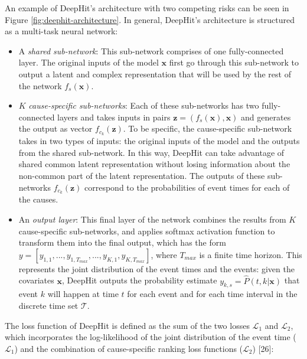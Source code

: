 \documentclass[
]{article}
\providecommand{\tightlist}{%
  \setlength{\itemsep}{0pt}\setlength{\parskip}{0pt}}
\begin{document}
An example of DeepHit's architecture with two competing risks can be seen in Figure \ref{fig:deephit-architecture}. In general, DeepHit's architecture is structured as a multi-task neural network:
\vspace{-0.5cm}

\begin{itemize}
\tightlist
\item
  A \emph{shared sub-network}: This sub-network comprises of one fully-connected layer. The original inputs of the model \(\mathbf{x}\) first go through this sub-network to output a latent and complex representation that will be used by the rest of the network \(f_s(\mathbf{x})\).
\item
  \(K\) \emph{cause-specific sub-networks}: Each of these sub-networks has two fully-connected layers and takes inputs in pairs \(\mathbf{z} = (f_s(\mathbf{x}), \mathbf{x})\) and generates the output as vector \(f_{c_k}(\mathbf{z})\). To be specific, the cause-specific sub-network takes in two types of inputs: the original inputs of the model and the outputs from the shared sub-network. In this way, DeepHit can take advantage of shared common latent representation without losing information about the non-common part of the latent representation. The outputs of these sub-networks \(f_{c_k}(\mathbf{z})\) correspond to the probabilities of event times for each of the causes.
\item
  An \emph{output layer}: This final layer of the network combines the results from \(K\) cause-specific sub-networks, and applies softmax activation function to transform them into the final output, which has the form \(y = [y_{1,1},...,y_{1,T_{max}},..., y_{K,1}, y_{K,T_{max}}]\), where \(T_{max}\) is a finite time horizon. This represents the joint distribution of the event times and the events: given the covariates \(\mathbf{x}\), DeepHit outputs the probability estimate \(y_{k,s} = \hat{P}(t, k|\mathbf{x})\) that event \(k\) will happen at time \(t\) for each event and for each time interval in the discrete time set \(\mathcal{T}\).
\end{itemize}

The loss function of DeepHit is defined as the sum of the two losses \(\mathcal{L}_1\) and \(\mathcal{L}_2\), which incorporates the log-likelihood of the joint distribution of the event time (\(\mathcal{L}_1\)) and the combination of cause-specific ranking loss functions (\(\mathcal{L}_2\)) {[}26{]}:
\vspace{-0.5cm}
\end{document}
